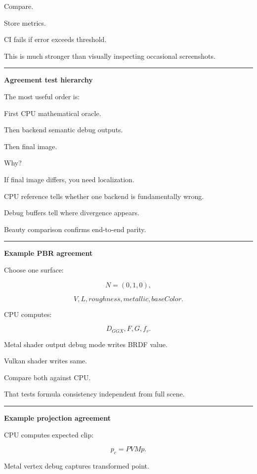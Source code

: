 Compare.

Store metrics.

CI fails if error exceeds threshold.

This is much stronger than visually inspecting occasional screenshots.

\begin{center}\rule{0.5\linewidth}{0.5pt}\end{center}

\textbf{Agreement test hierarchy}

The most useful order is:

First CPU mathematical oracle.

Then backend semantic debug outputs.

Then final image.

Why?

If final image differs, you need localization.

CPU reference tells whether one backend is fundamentally wrong.

Debug buffers tell where divergence appears.

Beauty comparison confirms end-to-end parity.

\begin{center}\rule{0.5\linewidth}{0.5pt}\end{center}

\textbf{Example PBR agreement}

Choose one surface:

\[
N=(0,1,0),
\]

\[
V,
L,
roughness,
metallic,
baseColor.
\]

CPU computes:

\[
D_{GGX},
F,
G,
f_r.
\]

Metal shader output debug mode writes BRDF value.

Vulkan shader writes same.

Compare both against CPU.

That tests formula consistency independent from full scene.

\begin{center}\rule{0.5\linewidth}{0.5pt}\end{center}

\textbf{Example projection agreement}

CPU computes expected clip:

\[
p_c=PVMp.
\]

Metal vertex debug captures transformed point.

